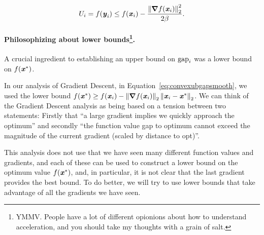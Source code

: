 \begin{equation}
  U_i = f(\boldsymbol{\mathit{y}}_i) \leq  f(\boldsymbol{\mathit{x}}_{i})
  - \frac{\left\| \boldsymbol{\nabla}  f(\boldsymbol{\mathit{x}}_{i}) \right\|_2^2}{2\beta}
  .\label{eq:agdub}
\end{equation}
\paragraph{Philosophizing about lower bounds\protect\footnote{YMMV. People
    have a lot of different opionions about how to understand acceleration, and you should take my thoughts with a grain of salt.}.}
A crucial ingredient to establishing an upper bound on $\text{gap}_i $ was a
lower bound on $f(\boldsymbol{\mathit{x}}^*)$.

In our analysis of Gradient Descent, in Equation~\eqref{eq:convexubgapsmooth}, we used the
lower bound ${f(\boldsymbol{\mathit{x}}^*) \geq f(\boldsymbol{\mathit{x}}_i) - \left\| \boldsymbol{\nabla} f(\boldsymbol{\mathit{x}}_{i}) \right\|_2 \left\| \boldsymbol{\mathit{x}}_i - \boldsymbol{\mathit{x}}^* \right\|_2 }$.
%
We can think of the Gradient Descent analysis as being based on a
tension between two statements: Firstly that ``a large gradient implies we quickly approach
the optimum'' and secondly ``the function value gap to optimum cannot exceed the magnitude of
the current gradient (scaled by distance to opt)''.

This analysis does not use that we have seen many different
function values and gradients, and each of these can be used to
construct a lower bound on the optimum value $f(\boldsymbol{\mathit{x}}^*)$, and, in
particular, it is not clear that the last gradient provides the best bound.
To do better, we will try to use lower bounds that take advantage of
all the gradients we have seen.

%
